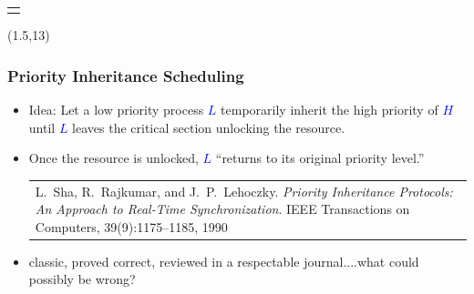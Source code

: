 \documentclass[dvipsnames,14pt,t]{beamer}
\newcommand{\bl}[1]{\textcolor{blue}{#1}}
\begin{document}
\begin{frame}[c]
\begin{textblock}{11}
\begin{tabular}{@{\hspace{-10mm}}l}
\begin{tikzpicture}[scale=1.1]
  \end{tikzpicture}
  \end{tabular}
  \end{textblock}

  \begin{textblock}{0}(1.5,13)%
  \small
  \end{textblock}

  \end{frame}
  
  \begin{frame}[c]
  \frametitle{\Large Priority Inheritance Scheduling}

  \begin{itemize}
  \item Idea: Let a low priority process \bl{$L$} temporarily inherit 
    the high priority of \bl{$H$} until \bl{$L$} leaves the critical 
    section unlocking the resource.\bigskip
  \item Once the resource is unlocked, \bl{$L$} ``returns to its original 
    priority level.''\\
    \mbox{}\hfill\footnotesize
    \begin{tabular}{p{6cm}@{}}
    L.~Sha, R.~Rajkumar, and J.~P.~Lehoczky. 
    {\it Priority Inheritance Protocols: An Approach to 
    Real-Time Synchronization}. IEEE Transactions on 
    Computers, 39(9):1175–1185, 1990
    \end{tabular}\bigskip\normalsize\pause
  
  \item classic, proved correct, reviewed in a respectable journal....what 
        could possibly be wrong?
    
  \end{itemize}

  \end{frame}
  
\end{document}
